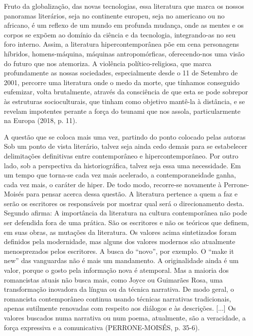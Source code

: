 \documentclass[../DISSERTACAO_MAIN.tex]{subfiles}
\begin{document}
Fruto da globalização, das novas tecnologias, essa literatura que marca os nossos panoramas literários, seja no continente europeu, seja no americano ou no africano, é um reflexo de um mundo em profunda mudança, onde as mentes e os corpos se expõem ao domínio da ciência e da tecnologia, integrando-as no seu foro interno. Assim, a literatura hipercontemporânea põe em cena personagens híbridos, homens-máquina, máquinas antropomórficas, oferecendo-nos uma visão do futuro que nos atemoriza. A violência político-religiosa, que marca profundamente as nossas sociedades, especialmente desde o 11 de Setembro de 2001, percorre uma literatura onde o medo da morte, que tínhamos conseguido eufemizar, volta brutalmente, através da consciência de que esta se pode sobrepor às estruturas socioculturais, que tinham como objetivo mantê-la à distância, e se revelam impotentes perante a força do tsunami que nos assola, particularmente na Europa (2018, p. 11).

A questão que se coloca mais uma vez, partindo do ponto colocado pelas autoras Sob um ponto de vista literário, talvez seja ainda cedo demais para se estabelecer delimitações definitivas entre contemporâneo e hipercontemporâneo. Por outro lado, sob a perspectiva da historiográfica, talvez seja essa uma necessidade. Em um tempo que torna-se cada vez mais acelerado, a contemporaneidade ganha, cada vez mais, o caráter de hiper. De todo modo, recorre-se novamente à Perrone-Moisés para pensar acerca dessa questão. A literatura pertence a quem a faz e serão os escritores os responsáveis por mostrar qual será o direcionamento desta. Segundo afirma:
A importância da literatura na cultura contemporânea não pode ser defendida fora de uma prática. São os escritores e não os teóricos que definem, em suas obras, as mutações da literatura. Os valores acima sintetizados foram definidos pela modernidade, mas alguns dos valores modernos são atualmente menosprezados pelos escritores. A busca do “novo”, por exemplo. O “make it new” das vanguardas não é mais um mandamento. A originalidade ainda é um valor, porque o gosto pela informação nova é atemporal. Mas a maioria dos romancistas atuais não busca mais, como Joyce ou Guimarães Rosa, uma transformação inovadora da língua ou da técnica narrativa. De modo geral, o romancista contemporâneo continua usando técnicas narrativas tradicionais, apenas sutilmente renovadas com respeito aos diálogos e às descrições. [...] Os valores buscados numa narrativa ou num poema, atualmente, são a veracidade, a força expressiva e a comunicativa (PERRONE-MOISÉS, p. 35-6).
\end{document}
